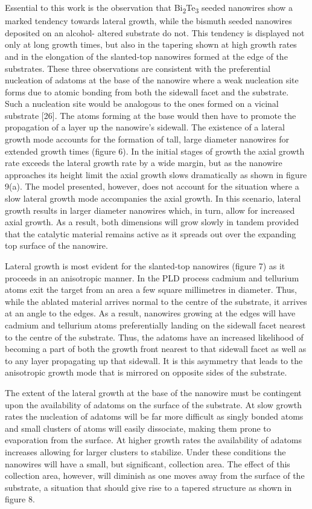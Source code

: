 Essential to this work is the observation that Bi\textsubscript{2}Te\textsubscript{3} seeded
nanowires show a marked tendency towards lateral growth,
while the bismuth seeded nanowires deposited on an alcohol-
altered substrate do not. This tendency is displayed not only
at long growth times, but also in the tapering shown at high
growth rates and in the elongation of the slanted-top nanowires
formed at the edge of the substrates. These three observations
are consistent with the preferential nucleation of adatoms at the
base of the nanowire where a weak nucleation site forms due to
atomic bonding from both the sidewall facet and the substrate.
Such a nucleation site would be analogous to the ones formed
on a vicinal substrate [26]. The atoms forming at the base
would then have to promote the propagation of a layer up the
nanowire's sidewall. The existence of a lateral growth mode
accounts for the formation of tall, large diameter nanowires
for extended growth times (figure 6). In the initial stages of
growth the axial growth rate exceeds the lateral growth rate by
a wide margin, but as the nanowire approaches its height limit
the axial growth slows dramatically as shown in figure 9(a).
The model presented, however, does not account for the
situation where a slow lateral growth mode accompanies the
axial growth. In this scenario, lateral growth results in larger
diameter nanowires which, in turn, allow for increased axial growth. As a result, both dimensions will grow slowly in
tandem provided that the catalytic material remains active as
it spreads out over the expanding top surface of the nanowire.

Lateral growth is most evident for the slanted-top
nanowires (figure 7) as it proceeds in an anisotropic manner.
In the PLD process cadmium and tellurium atoms exit the
target from an area a few square millimetres in diameter.
Thus, while the ablated material arrives normal to the centre
of the substrate, it arrives at an angle to the edges. As a
result, nanowires growing at the edges will have cadmium and
tellurium atoms preferentially landing on the sidewall facet
nearest to the centre of the substrate. Thus, the adatoms have
an increased likelihood of becoming a part of both the growth
front nearest to that sidewall facet as well as to any layer
propagating up that sidewall. It is this asymmetry that leads
to the anisotropic growth mode that is mirrored on opposite
sides of the substrate.

The extent of the lateral growth at the base of the nanowire
must be contingent upon the availability of adatoms on the
surface of the substrate. At slow growth rates the nucleation
of adatoms will be far more difficult as singly bonded atoms
and small clusters of atoms will easily dissociate, making
them prone to evaporation from the surface. At higher growth
rates the availability of adatoms increases allowing for larger
clusters to stabilize. Under these conditions the nanowires will
have a small, but significant, collection area. The effect of
this collection area, however, will diminish as one moves away
from the surface of the substrate, a situation that should give
rise to a tapered structure as shown in figure 8.

